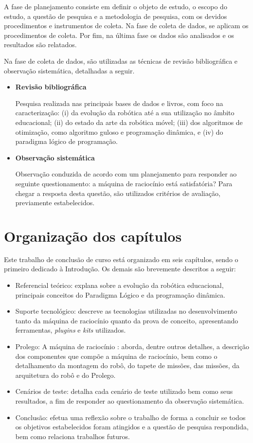 A fase de planejamento consiste em definir o objeto de estudo, o escopo do estudo, a questão de pesquisa e a metodologia de pesquisa, com os devidos procedimentos e instrumentos de coleta. Na fase de coleta de dados, se aplicam os procedimentos de coleta. Por fim, na última fase os dados são analisados e os resultados são relatados.

Na fase de coleta de dados, são utilizadas as técnicas de revisão bibliográfica e observação sistemática, detalhadas a seguir.
\begin{itemize}
\item \textbf{Revisão bibliográfica} 

Pesquisa realizada nas principais bases de dados e livros, com foco na caracterização: (i) da evolução da robótica até a sua utilização no âmbito educacional; (ii) do estado da arte da robótica móvel; (iii) dos algoritmos de otimização, como algoritmo guloso e programação dinâmica, e (iv) do paradigma lógico de programação.

\item \textbf{Observação sistemática}

Observação conduzida de acordo com um planejamento para responder ao seguinte questionamento: a máquina de raciocínio está satisfatória? Para chegar a resposta desta questão, são utilizados critérios de avaliação, previamente estabelecidos.

\end{itemize}
\section{Organização dos capítulos}
Este trabalho de conclusão de curso está organizado em seis capítulos, sendo o primeiro dedicado à Introdução. Os demais são brevemente descritos a seguir:
\begin{itemize}
\item Referencial teórico: explana sobre a evolução da robótica educacional, principais conceitos do Paradigma Lógico e da programação dinâmica. 
\item Suporte tecnológico: descreve as tecnologias utilizadas no desenvolvimento
tanto da máquina de raciocínio quanto da prova de conceito, apresentando ferramentas, \textit{plugins} e \textit{kits} utilizados.
\item Prolego: A máquina de raciocínio : aborda, dentre outros detalhes, a descrição dos componentes que compõe a máquina de raciocínio, bem como o detalhamento da montagem do robô, do tapete de missões, das missões, da arquitetura do robô e do Prolego.
\item Cenários de teste: detalha cada cenário de teste utilizado bem como seus resultados, a fim de responder ao questionamento da observação sistemática.
\item Conclusão: efetua uma reflexão sobre o trabalho de forma a concluir se todos os objetivos estabelecidos foram atingidos e a questão de pesquisa respondida, bem como relaciona trabalhos futuros.
\end{itemize}


